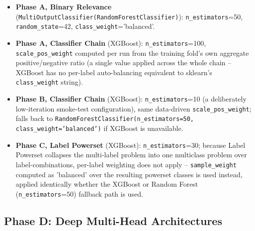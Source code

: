 \begin{itemize}
    \item \textbf{Phase A, Binary Relevance} (\texttt{MultiOutputClassifier(RandomForestClassifier)}): \texttt{n\_estimators}=50, \texttt{random\_state}=42, \texttt{class\_weight}='balanced'.  %
    \item \textbf{Phase A, Classifier Chain} (XGBoost): \texttt{n\_estimators}=100, \texttt{scale\_pos\_weight} computed per run from the training fold's own aggregate positive/negative ratio (a single value applied across the whole chain -- XGBoost has no per-label auto-balancing equivalent to sklearn's \texttt{class\_weight} string).  %
    \item \textbf{Phase B, Classifier Chain} (XGBoost): \texttt{n\_estimators}=10 (a deliberately low-iteration smoke-test configuration), same data-driven \texttt{scale\_pos\_weight}; falls back to \texttt{RandomForestClassifier(n\_estimators=50, class\_weight='balanced')} if XGBoost is unavailable.  %
    \item \textbf{Phase C, Label Powerset} (XGBoost): \texttt{n\_estimators}=30; because Label Powerset collapses the multi-label problem into one multiclass problem over label-combinations, per-label weighting does not apply -- \texttt{sample\_weight} computed as 'balanced' over the resulting powerset classes is used instead, applied identically whether the XGBoost or Random Forest (\texttt{n\_estimators}=50) fallback path is used.  %
\end{itemize}

\subsection{Phase D: Deep Multi-Head Architectures}

